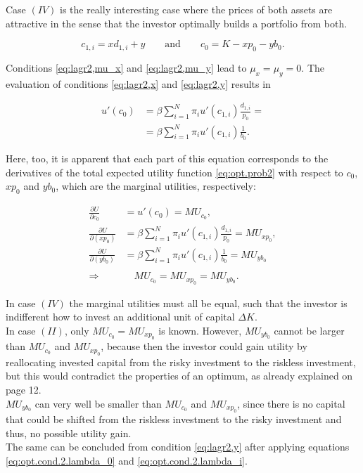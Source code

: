 \bigskip

\noindent Case $(IV)$ is the really interesting case where the prices of both assets are attractive in the sense that the investor optimally builds a portfolio from both.

\begin{equation*}
    c_{1,i} = x d_{1,i} + y \qquad \text{and} \qquad c_0 = K - x p_0 - y b_0.
\end{equation*}

\bigskip

\noindent Conditions \eqref{eq:lagr2,mu_x} and \eqref{eq:lagr2,mu_y} lead to $\mu_x = \mu_y = 0$. The evaluation of conditions \eqref{eq:lagr2,x} and \eqref{eq:lagr2,y} results in

\begin{equation}\label{eq:sol.prob2}
\begin{split}
    u'(c_0) &= \beta \sum_{i=1}^{N} \pi_i u'(c_{1,i}) \frac{d_{1,i}}{p_0}=\\
    &= \beta \sum_{i=1}^{N} \pi_i u'(c_{1,i}) \frac{1}{b_0}.
\end{split}
\end{equation}

\bigskip

\noindent Here, too, it is apparent that each part of this equation corresponds to the derivatives of the total expected utility function \eqref{eq:opt.prob2} with respect to $c_0$, $xp_0$ and $yb_0$, which are the marginal utilities, respectively:

\begin{align*}
    \frac{\partial U}{\partial c_0} &= u'(c_0) = MU_{c_0}, \\
    \frac{\partial U}{\partial (xp_0)} &= \beta \sum_{i=1}^{N} \pi_i u'(c_{1,i}) \frac{d_{1,i}}{p_0} = MU_{xp_0}, \\
    \frac{\partial U}{\partial (yb_0)} &= \beta \sum_{i=1}^{N} \pi_i u'(c_{1,i}) \frac{1}{b_0} = MU_{yb_0}\\
    &\\
    \Rightarrow & \quad MU_{c_0} = MU_{xp_0} = MU_{yb_0}.
\end{align*}

\bigskip

\noindent In case $(IV)$ the marginal utilities must all be equal, such that the investor is indifferent how to invest an additional unit of capital $\Delta K$.\\
In case $(II)$, only $MU_{c_0} = MU_{xp_0}$ is known. However, $MU_{yb_0}$ cannot be larger than $MU_{c_0}$ and $MU_{xp_0}$, because then the investor could gain utility by reallocating invested capital from the risky investment to the riskless investment, but this would contradict the properties of an optimum, as already explained on page 12. \\
$MU_{yb_0}$ can very well be smaller than $MU_{c_0}$ and $MU_{xp_0}$, since there is no capital that could be shifted from the riskless investment to the risky investment and thus, no possible utility gain.\\
The same can be concluded from condition \eqref{eq:lagr2,y} after applying equations \eqref{eq:opt.cond.2.lambda_0} and \eqref{eq:opt.cond.2.lambda_i}. \\

